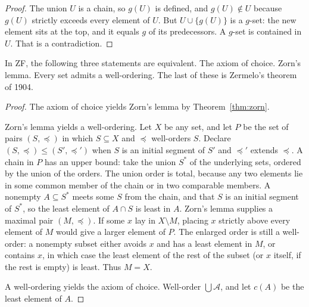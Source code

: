 \begin{proof}
The union $U$ is a chain, so $g(U)$ is defined, and $g(U)\notin U$ because $g(U)$ strictly exceeds every element of $U$. But $U\cup\{g(U)\}$ is a $g$-set: the new element sits at the top, and it equals $g$ of its predecessors. A $g$-set is contained in $U$. That is a contradiction.
\end{proof}

\begin{theorem}\label{thm:wellordering}
In ZF, the following three statements are equivalent. The axiom of choice. Zorn's lemma. Every set admits a well-ordering. The last of these is Zermelo's theorem of 1904.
\end{theorem}
\begin{proof}
The axiom of choice yields Zorn's lemma by Theorem~\ref{thm:zorn}.

Zorn's lemma yields a well-ordering. Let $X$ be any set, and let $P$ be the set of pairs $(S,\preceq)$ in which $S\subseteq X$ and $\preceq$ well-orders $S$. Declare $(S,\preceq)\le(S',\preceq')$ when $S$ is an initial segment of $S'$ and $\preceq'$ extends $\preceq$. A chain in $P$ has an upper bound: take the union $S^*$ of the underlying sets, ordered by the union of the orders. The union order is total, because any two elements lie in some common member of the chain or in two comparable members. A nonempty $A\subseteq S^*$ meets some $S$ from the chain, and that $S$ is an initial segment of $S^*$, so the least element of $A\cap S$ is least in $A$. Zorn's lemma supplies a maximal pair $(M,\preceq)$. If some $x$ lay in $X\setminus M$, placing $x$ strictly above every element of $M$ would give a larger element of $P$. The enlarged order is still a well-order: a nonempty subset either avoids $x$ and has a least element in $M$, or contains $x$, in which case the least element of the rest of the subset (or $x$ itself, if the rest is empty) is least.
Thus $M=X$.

A well-ordering yields the axiom of choice. Well-order $\bigcup\mathcal A$, and let $c(A)$ be the least element of $A$.
\end{proof}

